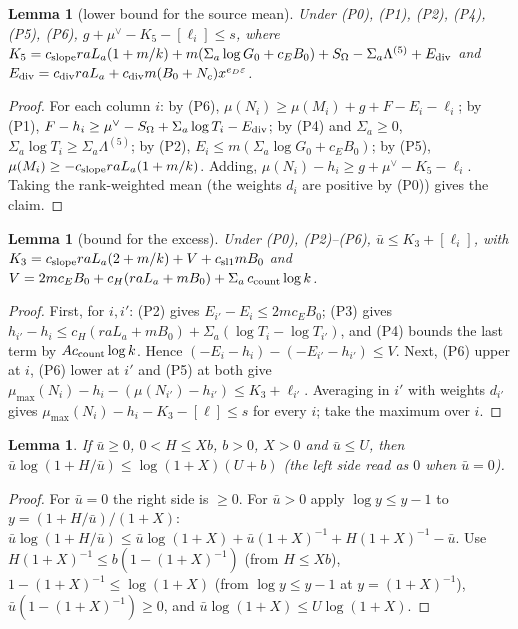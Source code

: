 \documentclass[10pt]{amsart}
\newtheorem{lemma}[theorem]{Lemma}
\theoremstyle{definition}
\theoremstyle{remark}
\begin{document}
\begin{lemma}[lower bound for the source mean]\label{lem:s-lower}
Under (P0), (P1), (P2), (P4), (P5), (P6),
$g+\mu^\vee-K_5-[\ell_i]\le s$, where
$K_5=c_{\rm slope}raL_a(1+m/k)+m(\Sigma_a\log G_0+c_EB_0)+S_\Omega-\Sigma_a\Lambda^{(5)}+E_{\rm div}$ and
$E_{\rm div}=c_{\rm div}raL_a+c_{\rm div}m(B_0+N_c)x^{e_D\varepsilon}$.
\end{lemma}
\begin{proof}
For each column $i$: by (P6), $\mu(N_i)\ge\mu(M_i)+g+F-E_i-\ell_i$; by (P1),
$F-h_i\ge\mu^\vee-S_\Omega+\Sigma_a\log T_i-E_{\rm div}$; by (P4) and $\Sigma_a\ge0$,
$\Sigma_a\log T_i\ge \Sigma_a\Lambda^{(5)}$; by (P2), $E_i\le m(\Sigma_a\log G_0+c_EB_0)$; by (P5),
$\mu(M_i)\ge-c_{\rm slope}raL_a(1+m/k)$. Adding,
$\mu(N_i)-h_i\ge g+\mu^\vee-K_5-\ell_i$. Taking the rank-weighted mean (the
weights $d_i$ are positive by (P0)) gives the claim.
\end{proof}

\begin{lemma}[bound for the excess]\label{lem:uF}
Under (P0), (P2)--(P6), $\bar u\le K_3+[\ell_i]$, with
$K_3=c_{\rm slope}raL_a(2+m/k)+V+c_{\rm sl1}mB_0$ and
$V=2mc_EB_0+c_H(raL_a+mB_0)+\Sigma_a\,c_{\rm count}\log k$.
\end{lemma}
\begin{proof}
First, for $i,i'$: (P2) gives $E_{i'}-E_i\le2mc_EB_0$; (P3) gives
$h_{i'}-h_i\le c_H(raL_a+mB_0)+\Sigma_a(\log T_i-\log T_{i'})$, and (P4) bounds the last
term by $Ac_{\rm count}\log k$. Hence $(-E_i-h_i)-(-E_{i'}-h_{i'})\le V$. Next,
(P6) upper at $i$, (P6) lower at $i'$ and (P5) at both give
$\mu_{\max}(N_i)-h_i-(\mu(N_{i'})-h_{i'})\le K_3+\ell_{i'}$. Averaging in $i'$
with weights $d_{i'}$ gives $\mu_{\max}(N_i)-h_i-K_3-[\ell]\le s$ for every $i$;
take the maximum over $i$.
\end{proof}

\begin{lemma}\label{lem:phi-bound}
If $\bar u\ge0$, $0<H\le Xb$, $b>0$, $X>0$ and $\bar u\le U$, then
$\bar u\log(1+H/\bar u)\le\log(1+X)(U+b)$ (the left side read as $0$ when $\bar u=0$).
\end{lemma}
\begin{proof}
For $\bar u=0$ the right side is $\ge0$. For $\bar u>0$ apply
$\log y\le y-1$ to $y=(1+H/\bar u)/(1+X)$:
$\bar u\log(1+H/\bar u)\le\bar u\log(1+X)+\bar u(1+X)^{-1}+H(1+X)^{-1}-\bar u$.
Use $H(1+X)^{-1}\le b(1-(1+X)^{-1})$ (from $H\le Xb$),
$1-(1+X)^{-1}\le\log(1+X)$ (from $\log y\le y-1$ at $y=(1+X)^{-1}$),
$\bar u(1-(1+X)^{-1})\ge0$, and $\bar u\log(1+X)\le U\log(1+X)$.
\end{proof}
\end{document}
